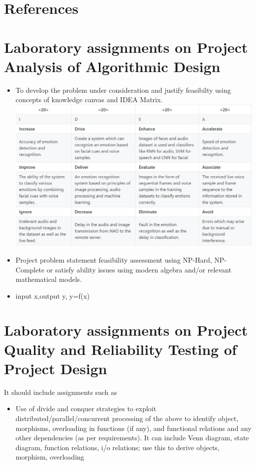 \documentclass[oneside,a4paper,12pt]{report}
\begin{document}
\begin{normalsize}
\begin{appendices}

\chapter{References}



\chapter{Laboratory assignments on Project Analysis of Algorithmic Design}
\begin{itemize}
\item To develop the problem under consideration and justify feasibilty using
concepts of knowledge canvas and IDEA Matrix.\\

\includegraphics[width=0.7 \textheight]{idea_matrix.JPG}
\newpage
\item Project problem statement feasibility assessment using NP-Hard, NP-Complete or satisfy ability issues using modern algebra and/or relevant mathematical models.
\item input x,output y, y=f(x)
\end{itemize}

\chapter{Laboratory assignments on Project Quality and Reliability Testing of Project Design}

It should include assignments such as
\begin{itemize}
\item Use of divide and conquer strategies to exploit distributed/parallel/concurrent processing of the above to identify object, morphisms, overloading in functions (if any), and functional relations and any other dependencies (as per requirements).
             It can include Venn diagram, state diagram, function relations, i/o relations; use this to derive objects, morphism, overloading


\end{itemize}
\end{appendices}
\end{normalsize}
\end{document}
